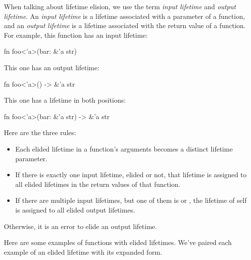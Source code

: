 \blank

When talking about lifetime elision, we use the term \emph{input lifetime} and \emph{output lifetime}. An \emph{input lifetime} is 
a lifetime associated with a parameter of a function, and an \emph{output lifetime} is a lifetime associated with the return value 
of a function. For example, this function has an input lifetime:

\begin{rustc}
fn foo<'a>(bar: &'a str)
\end{rustc}

This one has an output lifetime:

\begin{rustc}
fn foo<'a>() -> &'a str
\end{rustc}

This one has a lifetime in both positions:

\begin{rustc}
fn foo<'a>(bar: &'a str) -> &'a str
\end{rustc}

Here are the three rules:

\begin{itemize}
  \item{Each elided lifetime in a function's arguments becomes a distinct lifetime parameter.}
  \item{If there is exactly one input lifetime, elided or not, that lifetime is assigned to all elided lifetimes in the return 
      values of that function.}
  \item{If there are multiple input lifetimes, but one of them is  or , the lifetime of self is 
      assigned to all elided output lifetimes.}
\end{itemize}

Otherwise, it is an error to elide an output lifetime.


Here are some examples of functions with elided lifetimes. We've paired each example of an elided lifetime with its expanded form.

